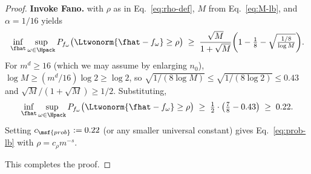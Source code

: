 \begin{proof}
\smallskip\noindent\textbf{Invoke Fano.}
 with $\rho$ as in Eq.~\eqref{eq:rho-def}, $M$ from Eq.~\eqref{eq:M-lb}, and $\alpha = 1/16$ yields
\begin{align*}
\inf_{\fhat} \sup_{\omega \in \Hpack} P_{f_\omega}\bigl( \Ltwonorm{\fhat - f_\omega} \geq \rho \bigr)
\;\geq\; \frac{\sqrt{M}}{1 + \sqrt{M}} \biggl(1 - \tfrac{1}{8} - \sqrt{\tfrac{1/8}{\log M}}\biggr).
\end{align*}
For $m^d \geq 16$ (which we may assume by enlarging $n_0$), $\log M \geq (m^d/16)\log 2 \geq \log 2$, so $\sqrt{1/(8 \log M)} \leq \sqrt{1/(8 \log 2)} \leq 0.43$ and $\sqrt{M}/(1+\sqrt{M}) \geq 1/2$. Substituting,
\begin{align}\label{eq:fano-numerical}
\inf_{\fhat} \sup_{\omega \in \Hpack} P_{f_\omega}\bigl( \Ltwonorm{\fhat - f_\omega} \geq \rho \bigr)
\;\geq\; \tfrac{1}{2} \cdot \bigl( \tfrac{7}{8} - 0.43 \bigr)
\;\geq\; 0.22.
\end{align}
Setting $c_{\msf{prob}} := 0.22$ (or any smaller universal constant) gives Eq.~\eqref{eq:prob-lb} with $\rho = c_\rho m^{-s}$.

This completes the proof.
\end{proof}
